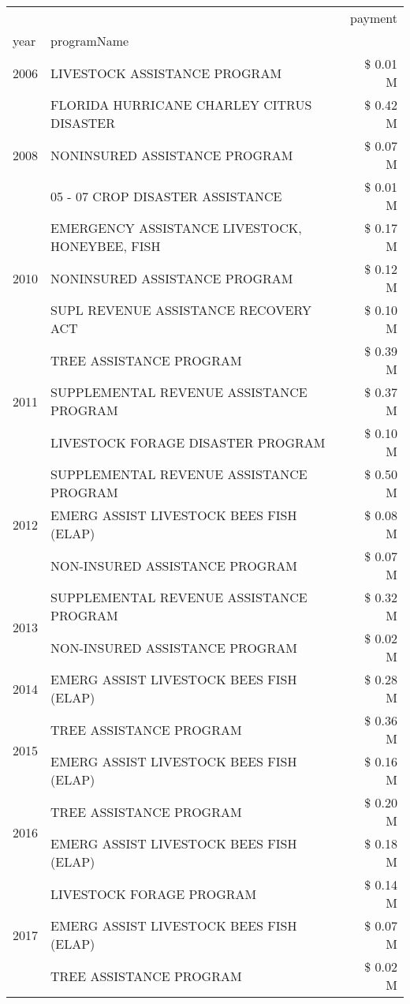 \begin{tabular}{llr}
\toprule
 &  & payment \\
year & programName &  \\
\midrule
2006 & LIVESTOCK ASSISTANCE PROGRAM & \$ 0.01 M \\
\cline{1-3}
\multirow[t]{3}{*}{2008} & FLORIDA HURRICANE CHARLEY CITRUS DISASTER & \$ 0.42 M \\
 & NONINSURED ASSISTANCE PROGRAM & \$ 0.07 M \\
 & 05 - 07 CROP DISASTER ASSISTANCE & \$ 0.01 M \\
\cline{1-3}
\multirow[t]{3}{*}{2010} & EMERGENCY ASSISTANCE LIVESTOCK, HONEYBEE, FISH & \$ 0.17 M \\
 & NONINSURED ASSISTANCE PROGRAM & \$ 0.12 M \\
 & SUPL REVENUE ASSISTANCE RECOVERY ACT & \$ 0.10 M \\
\cline{1-3}
\multirow[t]{3}{*}{2011} & TREE ASSISTANCE PROGRAM & \$ 0.39 M \\
 & SUPPLEMENTAL REVENUE ASSISTANCE PROGRAM & \$ 0.37 M \\
 & LIVESTOCK FORAGE DISASTER PROGRAM & \$ 0.10 M \\
\cline{1-3}
\multirow[t]{3}{*}{2012} & SUPPLEMENTAL REVENUE ASSISTANCE PROGRAM & \$ 0.50 M \\
 & EMERG ASSIST LIVESTOCK BEES FISH (ELAP) & \$ 0.08 M \\
 & NON-INSURED ASSISTANCE PROGRAM & \$ 0.07 M \\
\cline{1-3}
\multirow[t]{2}{*}{2013} & SUPPLEMENTAL REVENUE ASSISTANCE PROGRAM & \$ 0.32 M \\
 & NON-INSURED ASSISTANCE PROGRAM & \$ 0.02 M \\
\cline{1-3}
2014 & EMERG ASSIST LIVESTOCK BEES FISH (ELAP) & \$ 0.28 M \\
\cline{1-3}
\multirow[t]{2}{*}{2015} & TREE ASSISTANCE PROGRAM & \$ 0.36 M \\
 & EMERG ASSIST LIVESTOCK BEES FISH (ELAP) & \$ 0.16 M \\
\cline{1-3}
\multirow[t]{2}{*}{2016} & TREE ASSISTANCE PROGRAM                       & \$ 0.20 M \\
 & EMERG ASSIST LIVESTOCK BEES FISH (ELAP)       & \$ 0.18 M \\
\cline{1-3}
\multirow[t]{3}{*}{2017} & LIVESTOCK FORAGE PROGRAM & \$ 0.14 M \\
 & EMERG ASSIST LIVESTOCK BEES FISH (ELAP) & \$ 0.07 M \\
 & TREE ASSISTANCE PROGRAM & \$ 0.02 M \\

\end{tabular}
